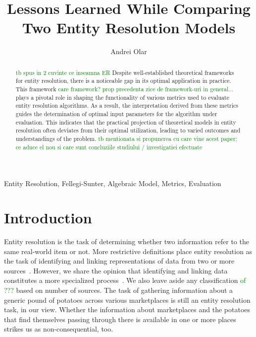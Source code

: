 \documentclass[journal]{IEEEtran}
\begin{document}
    \title{Lessons Learned While Comparing Two Entity Resolution Models}
    \author{Andrei Olar}

    \maketitle

    \theoremstyle{definition}
    \newtheorem{defn}{Definition}[section]
    
    \maketitle
    \begin{abstract}
        \textcolor{green}{tb spus in 2 cuvinte ce inseamna ER}
        Despite well-established theoretical frameworks for entity resolution,
        there is a noticeable gap in its optimal application in practice.
        This framework 
        \textcolor{green}{care framework? prop precedenta zice de framework-uri in general...}
        plays a pivotal role in shaping the functionality of
        various metrics used to evaluate entity resolution algorithms.
        As a result, the interpretation derived from these metrics guides the
        determination of optimal input parameters for the algorithm under
        evaluation.
        This indicates that the practical projection of theoretical models in
        entity resolution often deviates from their optimal utilization, leading
        to varied outcomes and understandings of the problem.
        \textcolor{green}{tb mentionata si propunerea cu care vine acest paper; ce aduce el nou si care sunt concluziile studiului / investigatiei efectuate}
    \end{abstract}

    \begin{IEEEkeywords}
        Entity Resolution, Fellegi-Sunter, Algebraic Model, Metrics, Evaluation
    \end{IEEEkeywords}

    \section{Introduction}\label{sec:introduction}
    Entity resolution is the task of determining whether two information refer
    to the same real-world item or not.
    More restrictive definitions place entity resolution as the task of
    identifying and linking representations of data from two or more
    sources~\cite{Qia17}.
    However, we share the opinion that identifying and linking data constitutes
    a more specialized process~\cite{Tal11}.
    We also leave aside any classification 
    \textcolor{green}{of ???} 
    based on number of sources.
    The task of gathering information about a generic pound of potatoes across
    various marketplaces is still an entity resolution task, in our view.
    Whether the information about marketplaces and the potatoes that find
    themselves passing through there is available in one or more places strikes
    us as non-consequential, too.
    
\end{document}
